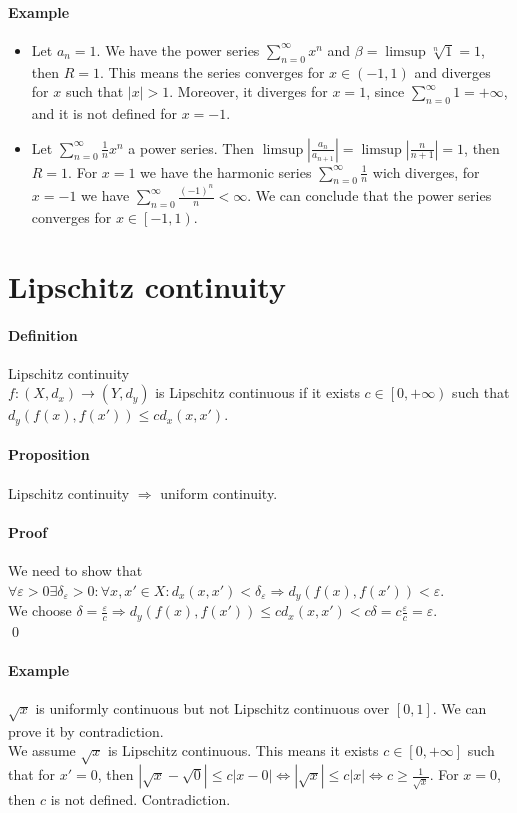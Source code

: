 \documentclass{article}
\newcommand{\DS}{\displaystyle}
\newcommand{\abs}[1]{\left|#1\right|}
\newcommand{\func}[3]{#1 : #2 \rightarrow #3}
\newcommand{\pseries}[1]{\sum_{n=0}^\infty #1}
\newcommand{\intcc}[1]{\left[#1\right]}
\newcommand{\intco}[1]{\left[#1\right)}
\newcommand{\intoo}[1]{\left(#1\right)}
\newcommand{\Ep}{\varepsilon}
\newcommand{\Def}{\paragraph{Definition}}
\newcommand{\Proposition}{\paragraph{Proposition}}
\newcommand{\Proof}{\paragraph{Proof}}
\newcommand{\Example}{\paragraph{Example}}
\begin{document}
	\Example
	\begin{itemize}
		\item %
		Let $a_n = 1$. We have the power series $\DS \pseries{x^n}$ and $\beta =
		\limsup \sqrt[n]{1} = 1$, then $R = 1$. This means the series converges for
		$x \in \intoo{-1,1}$ and diverges for $x$ such that $|x| > 1$. Moreover, it
		diverges for $x = 1$, since $\DS \pseries{1} = +\infty$, and it is not
		defined for $x = -1$.

		\item %
		Let $\DS \pseries{\frac{1}{n}x^n}$ a power series. Then $\limsup
		\abs{\frac{a_n}{a_{n+1}}} = \limsup \abs{\frac{n}{n+1}} = 1$, then $R = 1$.
		For $x = 1$ we have the harmonic series $\DS \pseries{\frac{1}{n}}$ wich
		diverges, for $x = -1$ we have $\DS \pseries{\frac{(-1)^n}{n}} < \infty$. We
		can conclude that the power series converges for $x \in \intco{-1,1}$.
	\end{itemize}


\section{Lipschitz continuity}

	\Def Lipschitz continuity
\\$\func{f}{(X,d_x)}{(Y,d_y)}$ is Lipschitz continuous if it exists $c \in
	\intco{0,+\infty}$ such that $d_y(f(x),f(x')) \leq c d_x(x,x')$.

	\Proposition Lipschitz continuity $\Rightarrow$ uniform continuity.

	\Proof We need to show that $\forall \Ep > 0 \exists \delta_\Ep > 0 : \forall
	x, x' \in X : d_x(x,x') < \delta_\Ep \Rightarrow d_y(f(x),f(x')) < \Ep$.
\\We choose $\delta = \frac{\Ep}{c} \Rightarrow d_y(f(x),f(x')) \leq
	c d_x(x,x') < c \delta = c \frac{\Ep}{c} = \Ep$.
\\\qed

	\Example $\sqrt{x}$ is uniformly continuous but not Lipschitz continuous over
	$\intcc{0,1}$. We can prove it by contradiction.
\\We assume $\sqrt{x}$ is Lipschitz continuous. This means it exists $c \in
	\intcc{0,+\infty}$ such that for $x' = 0$, then $|\sqrt{x} - \sqrt{0}| \leq
	c |x - 0| \iff |\sqrt{x}| \leq c |x| \iff c \geq \frac{1}{\sqrt{x}}$. For
	$x = 0$, then $c$ is not defined. Contradiction.
\end{document}
